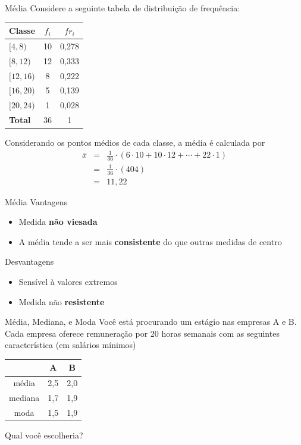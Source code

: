 \documentclass[10pt]{beamer}\usepackage[]{graphicx}\usepackage[]{color}
\theoremstyle{definition}
\begin{document}
\begin{frame}{Média}
  Considere a seguinte tabela de distribuição de frequência:
    \begin{table}[h]
    \centering
    \begin{tabular}{lcc}
      \hline
      \textbf{Classe} & \textbf{$f_i$} & \textbf{$fr_i$} \\
      \hline
      $[4,8)$ & 10 & 0,278 \\
      $[8,12)$ & 12 & 0,333 \\
      $[12,16)$ & 8 & 0,222 \\
      $[16,20)$ & 5 & 0,139 \\
      $[20,24)$ & 1 & 0,028 \\
      \hline
      \textbf{Total} & 36 & 1 \\
      \hline
    \end{tabular}
  \end{table}
  Considerando os pontos médios de cada classe, a média é calculada por
    \begin{eqnarray*}
    \bar{x} &=& \frac{1}{36} \cdot (6 \cdot 10 + 10 \cdot 12 + \cdots + 22 \cdot 1)\\
            &=& \frac{1}{36} \cdot (404)\\
            &=& 11,22
  \end{eqnarray*}
\end{frame}

\begin{frame}{Média}
  Vantagens
  \begin{itemize}
  \item Medida \textbf{não viesada}
  \item A média tende a ser mais \textbf{consistente} do que outras
    medidas de centro
  \end{itemize}
  Desvantagens
  \begin{itemize}
  \item Sensível à valores extremos
  \item Medida não \textbf{resistente}
  \end{itemize}
\end{frame}

\begin{frame}{Média, Mediana, e Moda}
  Você está procurando um estágio nas empresas A e B. Cada empresa
  oferece remuneração por 20 horas semanais com as seguintes
  característica (em salários mínimos)
  \begin{table}[h]
    \centering
    \begin{tabular}{ccc}
      \hline
       & A & B \\
      \hline
      média & 2,5 & 2,0 \\
      mediana & 1,7 & 1,9 \\
      moda & 1,5 & 1,9 \\
      \hline
    \end{tabular}
  \end{table}
  Qual você escolheria?
\end{frame}
\end{document}
